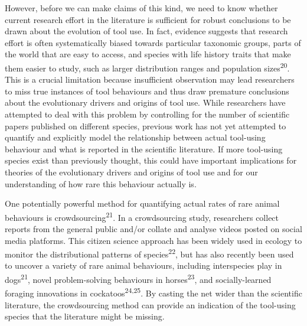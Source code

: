 \documentclass[
  man,floatsintext]{apa6}
\begin{document}
However, before we can make claims of this kind, we need to know whether current
research effort in the literature is sufficient for robust conclusions to be
drawn about the evolution of tool use. In fact, evidence suggests that research
effort is often systematically biased towards particular taxonomic groups, parts
of the world that are easy to access, and species with life history traits that
make them easier to study, such as larger distribution ranges and population
sizes\textsuperscript{20}. This is a crucial limitation because insufficient
observation may lead researchers to miss true instances of tool behaviours and
thus draw premature conclusions about the evolutionary drivers and origins of
tool use. While researchers have attempted to deal with this problem by
controlling for the number of scientific papers published on different species,
previous work has not yet attempted to quantify and explicitly model the
relationship between actual tool-using behaviour and what is reported in the
scientific literature. If more tool-using species exist than previously thought,
this could have important implications for theories of the evolutionary drivers
and origins of tool use and for our understanding of how rare this behaviour
actually is.

One potentially powerful method for quantifying actual rates of rare animal
behaviours is crowdsourcing\textsuperscript{21}. In a crowdsourcing study, researchers
collect reports from the general public and/or collate and analyse videos posted
on social media platforms. This citizen science approach has been widely used in
ecology to monitor the distributional patterns of species\textsuperscript{22}, but
has also recently been used to uncover a variety of rare animal behaviours,
including interspecies play in dogs\textsuperscript{21}, novel problem-solving
behaviours in horses\textsuperscript{23}, and socially-learned foraging innovations
in cockatoos\textsuperscript{24,25}. By casting the net wider than the
scientific literature, the crowdsourcing method can provide an indication of the
tool-using species that the literature might be missing.
\end{document}
